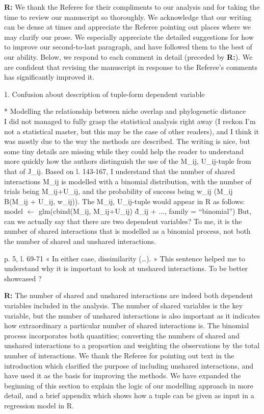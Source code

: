 \documentclass[12pt]{letter}
\newenvironment{refquote}{\bigskip \begin{it}}{\end{it}\smallskip}
\begin{document}
	\textbf{R:} We thank the Referee for their compliments to our analysis and for taking the time to review our manuscript so thoroughly. We acknowledge that our writing can be dense at times and appreciate the Referee pointing out places where we may clarify our prose. We especially appreciate the detailed suggestions for how to improve our second-to-last paragraph, and have followed them to the best of our ability. Below, we respond to each comment in detail (preceded by \textbf{R:}). We are confident that revising the manuscript in response to the Referee's comments has significantly improved it.


	1. Confusion about description of tuple-form dependent variable

		\begin{refquote}
			* Modelling the relationship between niche overlap and phylogenetic distance\\
			I did not managed to fully grasp the statistical analysis right away (I reckon I'm not a statistical master, but this may be the case of other readers), and I think it was mostly due to the way the methods are described. The writing is nice, but some tiny details are missing while they could help the reader to understand more quickly how the authors distinguish the use of the {M\_ij, U\_ij}-tuple from that of J\_ij.
			Based on l. 143-167, I understand that the number of shared interactions M\_ij is modelled with a binomial distribution, with the number of trials being M\_ij+U\_ij, and the probability of success being w\_ij (M\_ij ~ B(M\_ij + U\_ij, w\_ij)). The {M\_ij, U\_ij}-tuple would appear in R as follows:
			model $\leftarrow$ glm(cbind(M\_ij, M\_ij+U\_ij) \~ d\_ij + ..., family = “binomial”)
			But, can we actually say that there are two dependent variables? To me, it is the number of shared interactions that is modelled as a binomial process, not both the number of shared and unshared interactions.

			\smallskip

			p. 5, l. 69-71 « In either case, dissimilarity (…). » This sentence helped me to understand why it is important to look at unshared interactions. To be better showcased ?

		\end{refquote}


		\textbf{R:} The number of shared and unshared interactions are indeed both dependent variables included in the analysis. The number of shared variables is the key variable, but the number of unshared interactions is also important as it indicates how extraordinary a particular number of shared interactions is. The binomial process incorporates both quantities; converting the numbers of shared and unshared interactions to a proportion and weighting the observations by the total number of interactions. We thank the Referee for pointing out text in the introduction which clarified the purpose of including unshared interactions, and have used it as the basis for improving the methods. We have expanded the beginning of this section to explain the logic of our modelling approach in more detail, and a brief appendix which shows how a tuple can be given as input in a regression model in R.
\end{document}
